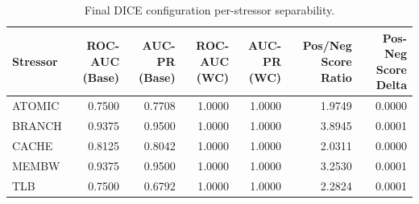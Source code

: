 \begin{table}[t]
\centering
\caption{Final DICE configuration per-stressor separability.}
\label{tab:dice_full_stressor}
\footnotesize
\begin{tabular}{lrrrrrr}
\toprule
Stressor & ROC-AUC (Base) & AUC-PR (Base) & ROC-AUC (WC) & AUC-PR (WC) & Pos/Neg Score Ratio & Pos-Neg Score Delta \\
\midrule
ATOMIC & 0.7500 & 0.7708 & 1.0000 & 1.0000 & 1.9749 & 0.0000 \\
BRANCH & 0.9375 & 0.9500 & 1.0000 & 1.0000 & 3.8945 & 0.0001 \\
CACHE & 0.8125 & 0.8042 & 1.0000 & 1.0000 & 2.0311 & 0.0000 \\
MEMBW & 0.9375 & 0.9500 & 1.0000 & 1.0000 & 3.2530 & 0.0001 \\
TLB & 0.7500 & 0.6792 & 1.0000 & 1.0000 & 2.2824 & 0.0001 \\
\bottomrule
\end{tabular}

\end{table}
